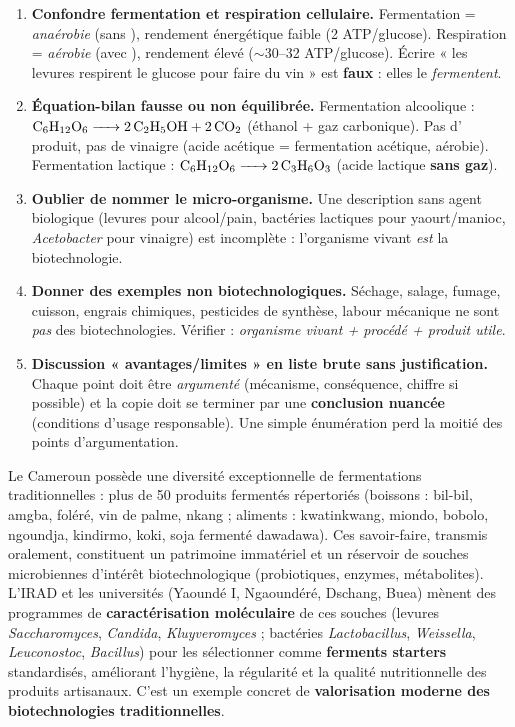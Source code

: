 \documentclass[11pt]{article}
\begin{document}
\begin{attention}
\begin{enumerate}
\item \textbf{Confondre fermentation et respiration cellulaire.} Fermentation = \emph{anaérobie} (sans ), rendement énergétique faible (2 ATP/glucose). Respiration = \emph{aérobie} (avec ), rendement élevé ($\sim$30--32 ATP/glucose). Écrire « les levures respirent le glucose pour faire du vin » est \textbf{faux} : elles le \emph{fermentent}.
\item \textbf{Équation-bilan fausse ou non équilibrée.} Fermentation alcoolique : $\ce{C6H12O6 -> 2 C2H5OH + 2 CO2}$ (éthanol + gaz carbonique). Pas d' produit, pas de vinaigre (acide acétique = fermentation acétique, aérobie). Fermentation lactique : $\ce{C6H12O6 -> 2 C3H6O3}$ (acide lactique \textbf{sans gaz}).
\item \textbf{Oublier de nommer le micro-organisme.} Une description sans agent biologique (levures pour alcool/pain, bactéries lactiques pour yaourt/manioc, \emph{Acetobacter} pour vinaigre) est incomplète : l'organisme vivant \emph{est} la biotechnologie.
\item \textbf{Donner des exemples non biotechnologiques.} Séchage, salage, fumage, cuisson, engrais chimiques, pesticides de synthèse, labour mécanique ne sont \emph{pas} des biotechnologies. Vérifier : \emph{organisme vivant + procédé + produit utile}.
\item \textbf{Discussion « avantages/limites » en liste brute sans justification.} Chaque point doit être \emph{argumenté} (mécanisme, conséquence, chiffre si possible) et la copie doit se terminer par une \textbf{conclusion nuancée} (conditions d'usage responsable). Une simple énumération perd la moitié des points d'argumentation.
\end{enumerate}
\end{attention}

\begin{savaistu}
Le Cameroun possède une diversité exceptionnelle de fermentations traditionnelles : plus de 50 produits fermentés répertoriés (boissons : bil-bil, amgba, foléré, vin de palme, nkang ; aliments : kwatinkwang, miondo, bobolo, ngoundja, kindirmo, koki, soja fermenté dawadawa). Ces savoir-faire, transmis oralement, constituent un patrimoine immatériel et un réservoir de souches microbiennes d'intérêt biotechnologique (probiotiques, enzymes, métabolites). L'IRAD et les universités (Yaoundé I, Ngaoundéré, Dschang, Buea) mènent des programmes de \textbf{caractérisation moléculaire} de ces souches (levures \emph{Saccharomyces}, \emph{Candida}, \emph{Kluyveromyces} ; bactéries \emph{Lactobacillus}, \emph{Weissella}, \emph{Leuconostoc}, \emph{Bacillus}) pour les sélectionner comme \textbf{ferments starters} standardisés, améliorant l'hygiène, la régularité et la qualité nutritionnelle des produits artisanaux. C'est un exemple concret de \textbf{valorisation moderne des biotechnologies traditionnelles}.
\end{savaistu}
\end{document}
